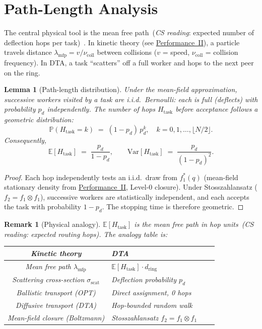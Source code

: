 \documentclass[11pt,a4paper]{article}
\newtheorem{lemma}[theorem]{Lemma}
\newtheorem{remark}{Remark}[section]
\newcommand{\physics}[2]{#1\ \textnormal{(\emph{CS reading}: #2)}}
\begin{document}
\section{Path-Length Analysis}

The central physical tool is the \physics{mean free path}{expected number of
deflection hops per task}~\cite{lifshitz_kinetics,chapman_cowling}.  In kinetic theory (see
\hyperref[chap:kinetic_theory]{Performance~II}), a particle travels distance
$\lambda_{\mathrm{mfp}} = v/\nu_{\mathrm{coll}}$ between collisions
($v$ = speed, $\nu_{\mathrm{coll}}$ = collision frequency).  In DTA,
a task ``scatters'' off a full worker and hops to the next peer on the ring.

\begin{lemma}[Path-length distribution]\label{lem:path_length}
Under the mean-field approximation, successive workers visited by a task
are i.i.d.\ Bernoulli: each is full (deflects) with probability $p_d$
independently.  The number of hops $H_{\mathrm{task}}$ before acceptance
follows a geometric distribution:
\[
  \mathbb{P}(H_{\mathrm{task}} = k) \;=\; (1 - p_d)\, p_d^k,
  \quad k = 0, 1, \ldots, \lfloor N/2 \rfloor.
\]
Consequently,
\[
  \mathbb{E}[H_{\mathrm{task}}] \;=\; \frac{p_d}{1 - p_d},
  \qquad
  \mathrm{Var}[H_{\mathrm{task}}] \;=\; \frac{p_d}{(1-p_d)^2}.
\]
\end{lemma}

\begin{proof}
Each hop independently tests an i.i.d.\ draw from $f_1^*(q)$ (mean-field
stationary density from \hyperref[chap:kinetic_theory]{Performance~II}, Level-0 closure).
Under Stosszahlansatz ($f_2 = f_1 \otimes f_1$), successive workers are
statistically independent, and each accepts the task with probability
$1 - p_d$.  The stopping time is therefore geometric.
\end{proof}

\begin{remark}[Physical analogy]
$\mathbb{E}[H_{\mathrm{task}}]$ is the \physics{mean free path in hop units}
{expected routing hops}.  The analogy table is:
\medskip

\noindent
\begin{tabularx}{\textwidth}{@{}clXl@{}}
\toprule
Kinetic theory & DTA \\
\midrule
Mean free path $\lambda_{\mathrm{mfp}}$ & $\mathbb{E}[H_{\mathrm{task}}]\cdot d_{\mathrm{ring}}$ \\
Scattering cross-section $\sigma_{\mathrm{scat}}$ & Deflection probability $p_d$ \\
Ballistic transport (OPT) & Direct assignment, 0 hops \\
Diffusive transport (DTA) & Hop-bounded random walk \\
Mean-field closure (Boltzmann) & Stosszahlansatz $f_2 = f_1 \otimes f_1$ \\
\bottomrule
\end{tabularx}
\end{remark}
\end{document}
